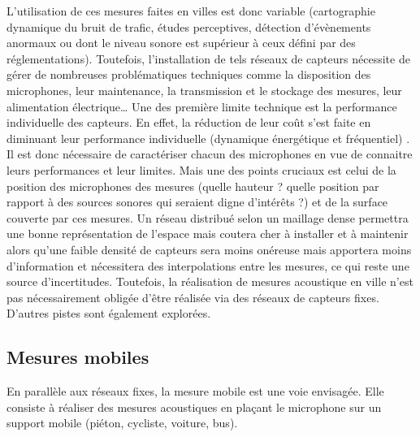 L'utilisation de ces mesures faites en villes est donc variable (cartographie dynamique du bruit de trafic, études perceptives, détection d'évènements anormaux ou dont le niveau sonore est supérieur à ceux défini par des réglementations). Toutefois, l'installation de tels réseaux de capteurs nécessite de gérer de nombreuses problématiques techniques comme la disposition des microphones, leur maintenance, la transmission et le stockage des mesures, leur alimentation électrique\dots{} Une des première limite technique est la performance individuelle des capteurs. En effet, la réduction de leur coût s'est faite en diminuant leur performance  individuelle (dynamique énergétique et fréquentiel) \cite{mydlarz2015design}. Il est donc nécessaire de caractériser chacun des microphones en vue de connaitre leurs performances et leur limites.
Mais une des points cruciaux est celui de la position des microphones des mesures (quelle hauteur ? quelle position par rapport à des sources sonores qui seraient digne d'intérêts ?) et de la surface couverte par ces mesures. Un réseau distribué selon un maillage dense permettra une bonne représentation de l'espace mais coutera cher à installer et à maintenir alors qu'une faible densité de capteurs sera moins onéreuse mais apportera moins d'information et nécessitera des interpolations entre les mesures, ce qui reste une source d'incertitudes.
Toutefois, la réalisation de mesures acoustique en ville n'est pas nécessairement obligée d'être réalisée via des réseaux de capteurs fixes. D'autres pistes sont également explorées.

\subsection{Mesures mobiles}

En parallèle aux réseaux fixes, la mesure mobile est une voie envisagée. Elle consiste à réaliser des mesures acoustiques en plaçant le microphone sur un support mobile (piéton, cycliste, voiture, bus). 

